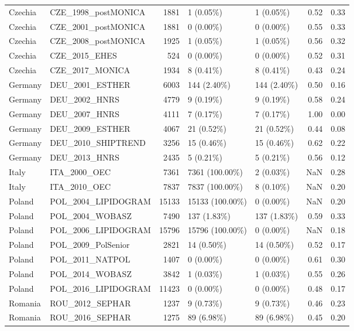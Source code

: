 \begin{longtable}{llrllrr}
Czechia & CZE\_1998\_postMONICA & 1881 & 1 (0.05\%) & 1 (0.05\%) & 0.52 & 0.33\\
Czechia & CZE\_2001\_postMONICA & 1881 & 0 (0.00\%) & 0 (0.00\%) & 0.55 & 0.33\\
Czechia & CZE\_2008\_postMONICA & 1925 & 1 (0.05\%) & 1 (0.05\%) & 0.56 & 0.32\\
Czechia & CZE\_2015\_EHES & 524 & 0 (0.00\%) & 0 (0.00\%) & 0.52 & 0.31\\
Czechia & CZE\_2017\_MONICA & 1934 & 8 (0.41\%) & 8 (0.41\%) & 0.43 & 0.24\\
\addlinespace
Germany & DEU\_2001\_ESTHER & 6003 & 144 (2.40\%) & 144 (2.40\%) & 0.50 & 0.16\\
Germany & DEU\_2002\_HNRS & 4779 & 9 (0.19\%) & 9 (0.19\%) & 0.58 & 0.24\\
Germany & DEU\_2007\_HNRS & 4111 & 7 (0.17\%) & 7 (0.17\%) & 1.00 & 0.00\\
Germany & DEU\_2009\_ESTHER & 4067 & 21 (0.52\%) & 21 (0.52\%) & 0.44 & 0.08\\
Germany & DEU\_2010\_SHIPTREND & 3256 & 15 (0.46\%) & 15 (0.46\%) & 0.62 & 0.22\\
Germany & DEU\_2013\_HNRS & 2435 & 5 (0.21\%) & 5 (0.21\%) & 0.56 & 0.12\\
\addlinespace
Italy & ITA\_2000\_OEC & 7361 & 7361 (100.00\%) & 2 (0.03\%) & NaN & 0.28\\
Italy & ITA\_2010\_OEC & 7837 & 7837 (100.00\%) & 8 (0.10\%) & NaN & 0.20\\
\addlinespace
Poland & POL\_2004\_LIPIDOGRAM & 15133 & 15133 (100.00\%) & 0 (0.00\%) & NaN & 0.20\\
Poland & POL\_2004\_WOBASZ & 7490 & 137 (1.83\%) & 137 (1.83\%) & 0.59 & 0.33\\
Poland & POL\_2006\_LIPIDOGRAM & 15796 & 15796 (100.00\%) & 0 (0.00\%) & NaN & 0.18\\
Poland & POL\_2009\_PolSenior & 2821 & 14 (0.50\%) & 14 (0.50\%) & 0.52 & 0.17\\
Poland & POL\_2011\_NATPOL & 1407 & 0 (0.00\%) & 0 (0.00\%) & 0.61 & 0.30\\
Poland & POL\_2014\_WOBASZ & 3842 & 1 (0.03\%) & 1 (0.03\%) & 0.55 & 0.26\\
Poland & POL\_2016\_LIPIDOGRAM & 11423 & 0 (0.00\%) & 0 (0.00\%) & 0.48 & 0.17\\
\addlinespace
Romania & ROU\_2012\_SEPHAR & 1237 & 9 (0.73\%) & 9 (0.73\%) & 0.46 & 0.23\\
Romania & ROU\_2016\_SEPHAR & 1275 & 89 (6.98\%) & 89 (6.98\%) & 0.45 & 0.20\\

\end{longtable}

